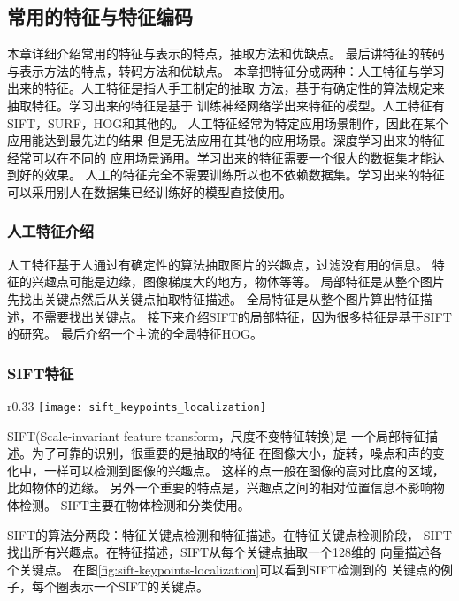 \subsection{常用的特征与特征编码}
\label{intro:image_features}
本章详细介绍常用的特征与表示的特点，抽取方法和优缺点。
最后讲特征的转码与表示方法的特点，转码方法和优缺点。
本章把特征分成两种：人工特征与学习出来的特征。人工特征是指人手工制定的抽取
方法，基于有确定性的算法规定来抽取特征。学习出来的特征是基于
训练神经网络学出来特征的模型。人工特征有SIFT，SURF，HOG和其他的。
人工特征经常为特定应用场景制作，因此在某个应用能达到最先进的结果
但是无法应用在其他的应用场景。深度学习出来的特征经常可以在不同的
应用场景通用。学习出来的特征需要一个很大的数据集才能达到好的效果。
人工的特征完全不需要训练所以也不依赖数据集。学习出来的特征
可以采用别人在数据集已经训练好的模型直接使用。

\subsubsection{人工特征介绍}
人工特征基于人通过有确定性的算法抽取图片的兴趣点，过滤没有用的信息。
特征的兴趣点可能是边缘，图像梯度大的地方，物体等等。
局部特征是从整个图片先找出关键点然后从关键点抽取特征描述。
全局特征是从整个图片算出特征描述，不需要找出关键点。
接下来介绍SIFT的局部特征，因为很多特征是基于SIFT的研究。
最后介绍一个主流的全局特征HOG。

\subsubsection{SIFT特征}
\begin{wrapfigure}{r}{0.33\textwidth}
  \centering
    \texttt{[image: sift\_keypoints\_localization]}
    \caption{SIFT关键点检测过程。图片源：\cite{wiki:sift}}
  \label{fig:sift-keypoints-localization}
\end{wrapfigure}

SIFT(Scale-invariant feature transform，尺度不变特征转换)是
一个局部特征描述。\cite{lowe1999object}为了可靠的识别，很重要的是抽取的特征
在图像大小，旋转，噪点和声的变化中，一样可以检测到图像的兴趣点。
这样的点一般在图像的高对比度的区域，比如物体的边缘。
另外一个重要的特点是，兴趣点之间的相对位置信息不影响物体检测。
SIFT主要在物体检测和分类使用。

SIFT的算法分两段：特征关键点检测和特征描述。在特征关键点检测阶段，
SIFT找出所有兴趣点。在特征描述，SIFT从每个关键点抽取一个128维的
向量描述各个关键点。\cite{wiki:sift}
在图\ref{fig:sift-keypoints-localization}可以看到SIFT检测到的
关键点的例子，每个圈表示一个SIFT的关键点。

